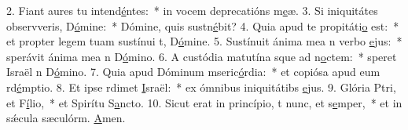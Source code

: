 2. Fiant aures tu intend\uline{é}ntes:~* in vocem deprecatións m\uline{e}æ.
3. Si iniquitátes observveris, D\uline{ó}mine:~* Dómine, quis sustn\uline{é}bit?
4. Quia apud te propitáti\uline{o} est:~* et propter legem tuam sustínui t, D\uline{ó}mine.
5. Sustínuit ánima mea n verbo \uline{e}jus:~* sperávit ánima mea n D\uline{ó}mino.
6. A custódia matutína sque ad n\uline{o}ctem:~* speret Israël n D\uline{ó}mino.
7. Quia apud Dóminum mseric\uline{ó}rdia:~* et copiósa apud eum rd\uline{é}mptio.
8. Et ipse rdimet \uline{I}sraël:~* ex ómnibus iniquitátibs \uline{e}jus.
9. Glória Ptri, et F\uline{í}lio,~* et Spirítu S\uline{a}ncto.
10. Sicut erat in princípio, t nunc, et s\uline{e}mper,~* et in sǽcula sæculórm. \uline{A}men.

